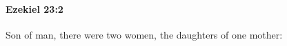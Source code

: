
		\paragraph{Ezekiel 23:2} %
			\label{EZEKIEL-23-2}

			Son of man, there were two women, the daughters of one mother:


